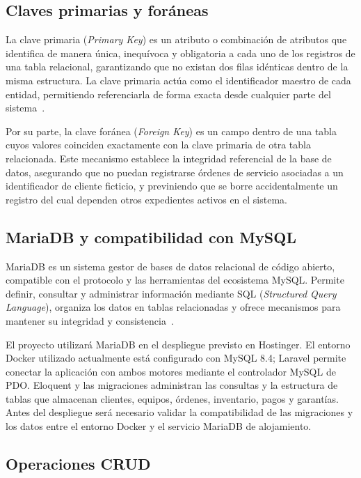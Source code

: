 \subsection{Claves primarias y foráneas}

La clave primaria (\textit{Primary Key}) es un atributo o combinación de atributos que identifica de manera única, inequívoca y obligatoria a cada uno de los registros de una tabla relacional, garantizando que no existan dos filas idénticas dentro de la misma estructura. La clave primaria actúa como el identificador maestro de cada entidad, permitiendo referenciarla de forma exacta desde cualquier parte del sistema~\cite{elmasri2016fundamentals}.

Por su parte, la clave foránea (\textit{Foreign Key}) es un campo dentro de una tabla cuyos valores coinciden exactamente con la clave primaria de otra tabla relacionada. Este mecanismo establece la integridad referencial de la base de datos, asegurando que no puedan registrarse órdenes de servicio asociadas a un identificador de cliente ficticio, y previniendo que se borre accidentalmente un registro del cual dependen otros expedientes activos en el sistema.

\subsection{MariaDB y compatibilidad con MySQL}

MariaDB es un sistema gestor de bases de datos relacional de código abierto, compatible con el protocolo y las herramientas del ecosistema MySQL. Permite definir, consultar y administrar información mediante SQL (\textit{Structured Query Language}), organiza los datos en tablas relacionadas y ofrece mecanismos para mantener su integridad y consistencia~\cite{mariadb_doc}.

El proyecto utilizará MariaDB en el despliegue previsto en Hostinger. El entorno Docker utilizado actualmente está configurado con MySQL 8.4; Laravel permite conectar la aplicación con ambos motores mediante el controlador MySQL de PDO. Eloquent y las migraciones administran las consultas y la estructura de tablas que almacenan clientes, equipos, órdenes, inventario, pagos y garantías. Antes del despliegue será necesario validar la compatibilidad de las migraciones y los datos entre el entorno Docker y el servicio MariaDB de alojamiento.

\subsection{Operaciones CRUD}


